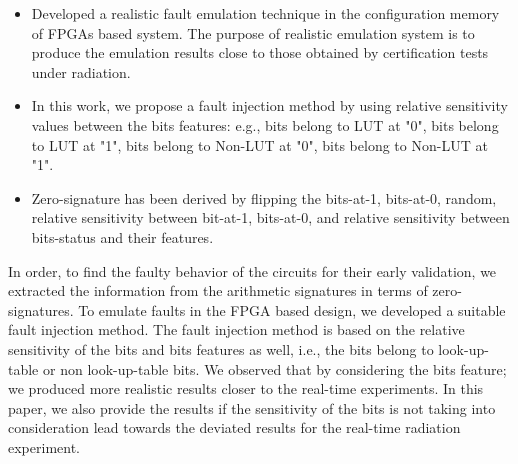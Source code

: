 \begin{itemize}



\item{Developed a realistic fault emulation technique in the configuration memory
of FPGAs based system. The purpose of realistic emulation system is to produce
the emulation results close to those obtained by certification tests under
radiation}.

\item{In this work, we propose a fault injection method by using relative sensitivity values between the bits features: e.g., bits belong to LUT at "0", bits belong to LUT at "1", bits belong to Non-LUT at "0", bits belong to Non-LUT at "1"}.

\item{Zero-signature has been derived by flipping the bits-at-1, bits-at-0, random, relative sensitivity between bit-at-1, bits-at-0, and relative sensitivity between bits-status and their features}.
\end{itemize}


In order, to find the faulty behavior of the circuits for their early validation, we extracted the information from the arithmetic signatures in terms of zero-signatures. To emulate faults in the FPGA based design, we  developed a suitable fault injection method. The fault injection method is based on the relative sensitivity of the bits and bits features as well, i.e., the bits belong to look-up-table or non look-up-table bits. We observed that by considering the bits feature; we produced more realistic results closer to the real-time experiments. In this paper, we also provide the results if the sensitivity of the bits is not taking into consideration lead towards the deviated results for the real-time radiation experiment.


